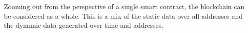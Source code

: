 Zooming out from the perspective of a single smart contract, the blockchain can be considered as a whole.
This is a mix of the static data over all addresses and the dynamic data generated over time and addresses.
